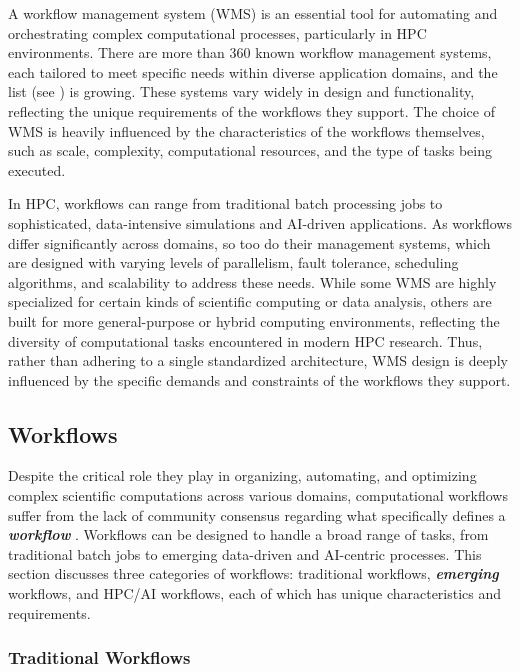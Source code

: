 \documentclass[sigconf]{acmart}
\begin{document}
A workflow management system (WMS) is an essential tool for automating and orchestrating complex computational processes, particularly in HPC environments. There are more than 360 known workflow management systems, each tailored to meet specific needs within diverse application domains, and the list (see \citep{workflow-list}) is growing. These systems vary widely in design and functionality, reflecting the unique requirements of the workflows they support. The choice of WMS is heavily influenced by the characteristics of the workflows themselves, such as scale, complexity, computational resources, and the type of tasks being executed.

In HPC, workflows can range from traditional batch processing jobs to sophisticated, data-intensive simulations and AI-driven applications. As workflows differ significantly across domains, so too do their management systems, which are designed with varying levels of parallelism, fault tolerance, scheduling algorithms, and scalability to address these needs. While some WMS are highly specialized for certain kinds of scientific computing or data analysis, others are built for more general-purpose or hybrid computing environments, reflecting the diversity of computational tasks encountered in modern HPC research. Thus, rather than adhering to a single standardized architecture, WMS design is deeply influenced by the specific demands and constraints of the workflows they support.


\subsection{Workflows}

Despite the critical role they play in organizing, automating, and optimizing complex scientific computations across various domains, computational workflows suffer from the lack of community consensus regarding what specifically defines a {\em\bf workflow} \citep{ferreira_da_silva2022, wilkinson2025}. Workflows can be designed to handle a broad range of tasks, from traditional batch jobs to emerging data-driven and AI-centric processes. This section discusses three categories of workflows: traditional workflows, {\em\bf emerging} workflows, and HPC/AI workflows, each of which has unique characteristics and requirements.

\subsubsection{Traditional Workflows}
\end{document}
